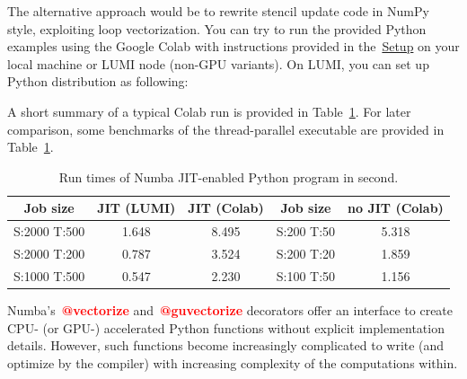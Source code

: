 


\par
The alternative approach would be to rewrite stencil update code in NumPy style, exploiting loop vectorization.
You can try to run the provided Python examples using the Google Colab with instructions provided in the~\href{https://enccs.github.io/gpu-programming/0-setup/#running-on-google-colab}{Setup} on your local machine or LUMI node (non-GPU variants).
On LUMI, you can set up Python distribution as following:



\par
A short summary of a typical Colab run is provided in Table~\ref{tbl:gpu_python_google_colab}. 
For later comparison, some benchmarks of the thread-parallel executable are provided in Table~\ref{tbl:gpu_python_google_colab}.


\begin{table}[!h]
\centering\caption{Run times of Numba JIT-enabled Python program in second.}\label{tbl:gpu_python_google_colab}
\begin{tabular}{ |c|c|c|c|c| } 
\hline
\textbf{Job size} & \textbf{JIT (LUMI)} & \textbf{JIT (Colab)} & \textbf{Job size} & \textbf{no JIT (Colab)} \\
\hline
S:2000 T:500 & 1.648 & 8.495 & S:200 T:50 & 5.318 \\
S:2000 T:200 & 0.787 & 3.524 & S:200 T:20 & 1.859 \\
S:1000 T:500 & 0.547 & 2.230 & S:100 T:50 & 1.156 \\
\hline
\end{tabular}
\end{table}


\par
Numba’s~\textbf{\textcolor{red}{@vectorize}} and~\textbf{\textcolor{red}{@guvectorize}} decorators offer an interface to create CPU- (or GPU-) accelerated Python functions without explicit implementation details.
However, such functions become increasingly complicated to write (and optimize by the compiler) with increasing complexity of the computations within.


